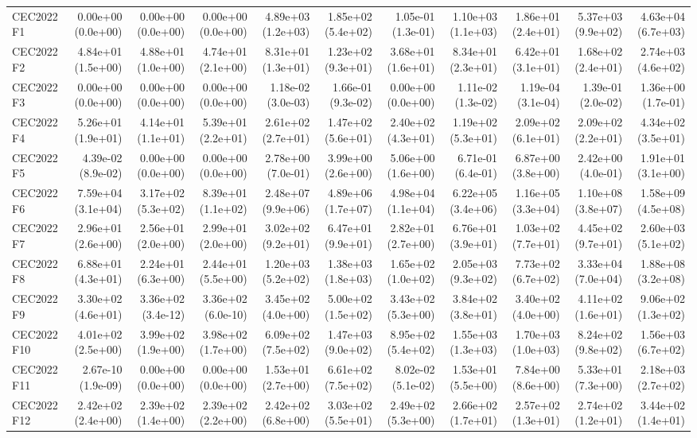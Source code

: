 \begin{longtable}{lrrrrrrrrrr}
CEC2022 F1 & 0.00e+00 (0.0e+00) & 0.00e+00 (0.0e+00) & 0.00e+00 (0.0e+00) & 4.89e+03 (1.2e+03) & 1.85e+02 (5.4e+02) & 1.05e-01 (1.3e-01) & 1.10e+03 (1.1e+03) & 1.86e+01 (2.4e+01) & 5.37e+03 (9.9e+02) & 4.63e+04 (6.7e+03) \\
CEC2022 F2 & 4.84e+01 (1.5e+00) & 4.88e+01 (1.0e+00) & 4.74e+01 (2.1e+00) & 8.31e+01 (1.3e+01) & 1.23e+02 (9.3e+01) & 3.68e+01 (1.6e+01) & 8.34e+01 (2.3e+01) & 6.42e+01 (3.1e+01) & 1.68e+02 (2.4e+01) & 2.74e+03 (4.6e+02) \\
CEC2022 F3 & 0.00e+00 (0.0e+00) & 0.00e+00 (0.0e+00) & 0.00e+00 (0.0e+00) & 1.18e-02 (3.0e-03) & 1.66e-01 (9.3e-02) & 0.00e+00 (0.0e+00) & 1.11e-02 (1.3e-02) & 1.19e-04 (3.1e-04) & 1.39e-01 (2.0e-02) & 1.36e+00 (1.7e-01) \\
CEC2022 F4 & 5.26e+01 (1.9e+01) & 4.14e+01 (1.1e+01) & 5.39e+01 (2.2e+01) & 2.61e+02 (2.7e+01) & 1.47e+02 (5.6e+01) & 2.40e+02 (4.3e+01) & 1.19e+02 (5.3e+01) & 2.09e+02 (6.1e+01) & 2.09e+02 (2.2e+01) & 4.34e+02 (3.5e+01) \\
CEC2022 F5 & 4.39e-02 (8.9e-02) & 0.00e+00 (0.0e+00) & 0.00e+00 (0.0e+00) & 2.78e+00 (7.0e-01) & 3.99e+00 (2.6e+00) & 5.06e+00 (1.6e+00) & 6.71e-01 (6.4e-01) & 6.87e+00 (3.8e+00) & 2.42e+00 (4.0e-01) & 1.91e+01 (3.1e+00) \\
CEC2022 F6 & 7.59e+04 (3.1e+04) & 3.17e+02 (5.3e+02) & 8.39e+01 (1.1e+02) & 2.48e+07 (9.9e+06) & 4.89e+06 (1.7e+07) & 4.98e+04 (1.1e+04) & 6.22e+05 (3.4e+06) & 1.16e+05 (3.3e+04) & 1.10e+08 (3.8e+07) & 1.58e+09 (4.5e+08) \\
CEC2022 F7 & 2.96e+01 (2.6e+00) & 2.56e+01 (2.0e+00) & 2.99e+01 (2.0e+00) & 3.02e+02 (9.2e+01) & 6.47e+01 (9.9e+01) & 2.82e+01 (2.7e+00) & 6.76e+01 (3.9e+01) & 1.03e+02 (7.7e+01) & 4.45e+02 (9.7e+01) & 2.60e+03 (5.1e+02) \\
CEC2022 F8 & 6.88e+01 (4.3e+01) & 2.24e+01 (6.3e+00) & 2.44e+01 (5.5e+00) & 1.20e+03 (5.2e+02) & 1.38e+03 (1.8e+03) & 1.65e+02 (1.0e+02) & 2.05e+03 (9.3e+02) & 7.73e+02 (6.7e+02) & 3.33e+04 (7.0e+04) & 1.88e+08 (3.2e+08) \\
CEC2022 F9 & 3.30e+02 (4.6e+01) & 3.36e+02 (3.4e-12) & 3.36e+02 (6.0e-10) & 3.45e+02 (4.0e+00) & 5.00e+02 (1.5e+02) & 3.43e+02 (5.3e+00) & 3.84e+02 (3.8e+01) & 3.40e+02 (4.0e+00) & 4.11e+02 (1.6e+01) & 9.06e+02 (1.3e+02) \\
CEC2022 F10 & 4.01e+02 (2.5e+00) & 3.99e+02 (1.9e+00) & 3.98e+02 (1.7e+00) & 6.09e+02 (7.5e+02) & 1.47e+03 (9.0e+02) & 8.95e+02 (5.4e+02) & 1.55e+03 (1.3e+03) & 1.70e+03 (1.0e+03) & 8.24e+02 (9.8e+02) & 1.56e+03 (6.7e+02) \\
CEC2022 F11 & 2.67e-10 (1.9e-09) & 0.00e+00 (0.0e+00) & 0.00e+00 (0.0e+00) & 1.53e+01 (2.7e+00) & 6.61e+02 (7.5e+02) & 8.02e-02 (5.1e-02) & 1.53e+01 (5.5e+00) & 7.84e+00 (8.6e+00) & 5.33e+01 (7.3e+00) & 2.18e+03 (2.7e+02) \\
CEC2022 F12 & 2.42e+02 (2.4e+00) & 2.39e+02 (1.4e+00) & 2.39e+02 (2.2e+00) & 2.42e+02 (6.8e+00) & 3.03e+02 (5.5e+01) & 2.49e+02 (5.3e+00) & 2.66e+02 (1.7e+01) & 2.57e+02 (1.3e+01) & 2.74e+02 (1.2e+01) & 3.44e+02 (1.4e+01) \\
\bottomrule
\end{longtable}

